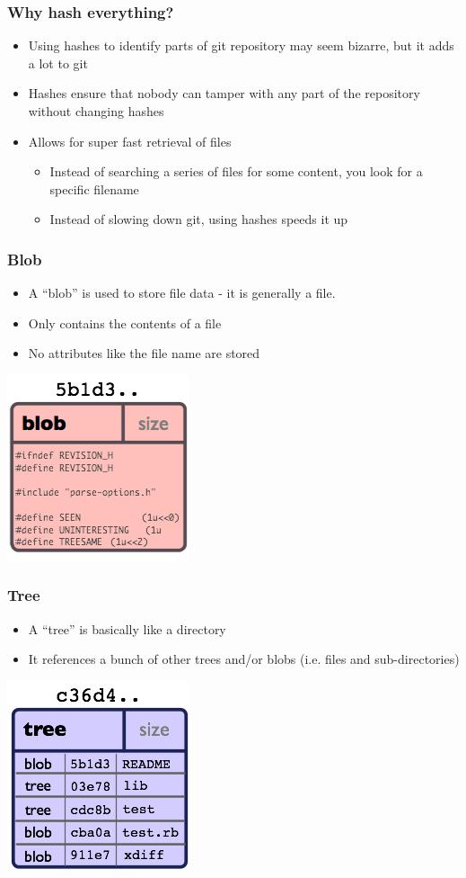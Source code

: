 \documentclass{beamer}
\begin{document}
\begin{frame}
  \frametitle{Why hash everything?}
  \begin{itemize}
    \item Using hashes to identify parts of git repository may seem bizarre, but it adds a lot to git
    \item Hashes ensure that nobody can tamper with any part of the repository without changing hashes
    \item Allows for super fast retrieval of files
      \begin{itemize}
	\item Instead of searching a series of files for some content, you look for a specific filename
	\item Instead of slowing down git, using hashes speeds it up
      \end{itemize}
  \end{itemize}
\end{frame}

\begin{frame}
  \frametitle{Blob}
  \begin{itemize}
    \item A ``blob'' is used to store file data - it is generally a file.
    \item Only contains the contents of a file 
    \item No attributes like the file name are stored
  \end{itemize}
  \includegraphics{images/object-blob.png}
\end{frame}

\begin{frame}
  \frametitle{Tree}
  \begin{itemize}
    \item A ``tree'' is basically like a directory 
    \item It references a bunch of other trees and/or blobs (i.e. files and sub-directories)
  \end{itemize}
  \includegraphics{images/object-tree.png}
\end{frame}
\end{document}
